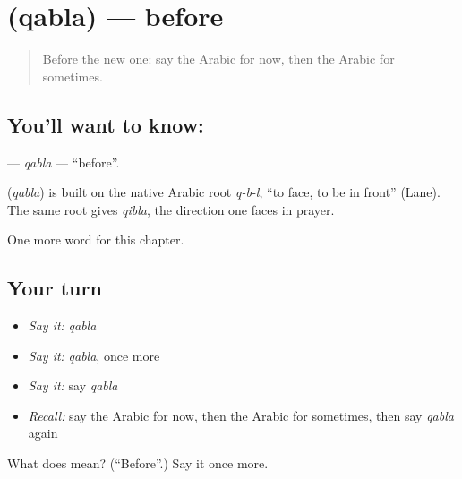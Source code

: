 \section[\texorpdfstring{\ar{قبل} (qabla)}{قبل (qabla)}]{ (qabla) — before}

\label{lesson:AR-C87-qabla}



\begin{quote}
Before the new one: say the Arabic for now, then the Arabic for sometimes.
\end{quote}

\subsection*{You'll want to know: }
\textbf{} — \emph{qabla} — \textquotedblleft{}before\textquotedblright{}.

\begin{cousinweb}
\textbf{} (\emph{qabla}) is built on the native Arabic root \emph{q-b-l}, \textquotedblleft{}to face, to be in front\textquotedblright{} (Lane). The same root gives \emph{qibla}, the direction one faces in prayer.
\end{cousinweb}

\begin{grammarlens}[title={What you've built}]
One more word for this chapter.
\end{grammarlens}

\subsection*{Your turn}
\begin{itemize}
\raggedright
  \item \emph{Say it:} \emph{qabla}
  \item \emph{Say it:} \emph{qabla}, once more
  \item \emph{Say it:} say \emph{qabla}
  \item \emph{Recall:} say the Arabic for now, then the Arabic for sometimes, then say \emph{qabla} again
\end{itemize}

\begin{tcolorbox}[breakable,colback=teal!4,colframe=teal!35!black,title={Before you move on}]
What does  mean? (\textquotedblleft{}Before\textquotedblright{}.) Say it once more.
\end{tcolorbox}
